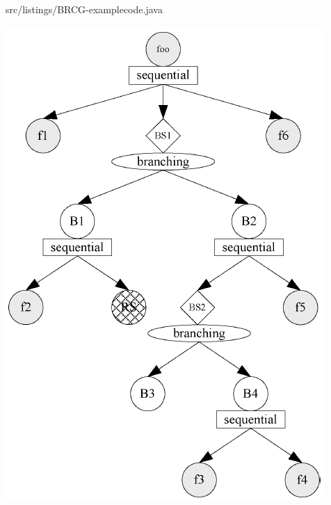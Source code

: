 \noindent\begin{minipage}{.35\textwidth}
	\vspace{7em}
	\lstset{language=Java}
	 {src/listings/BRCG-examplecode.java}
\end{minipage}\hfill
\begin{minipage}{.55\textwidth}
	\includegraphics[width=.75\textwidth]{src/pic/BRCG-example.png}
	\label{graph:BRCG}
	\vspace{2em}
\end{minipage}

